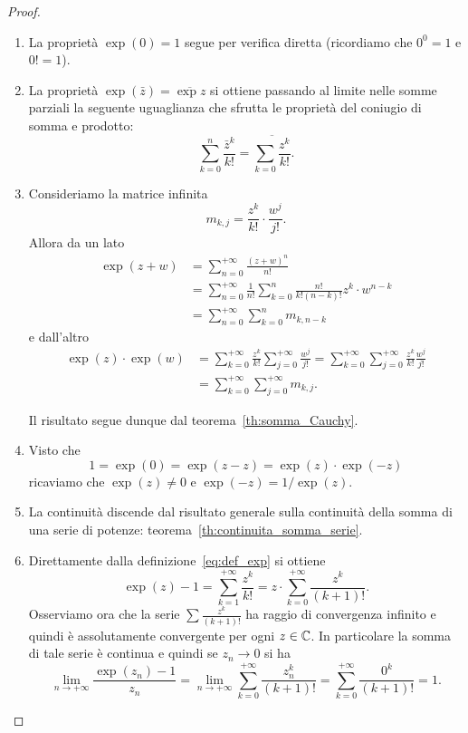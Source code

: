 \begin{proof}
\mymark{*}
\begin{enumerate}
\item
La proprietà $\exp(0)=1$ segue per verifica diretta (ricordiamo che $0^0=1$
e $0!=1$).

\item La proprietà $\exp(\bar z) = \overline{\exp z}$ si ottiene
passando al limite nelle somme parziali la seguente uguaglianza
che sfrutta le proprietà del coniugio di somma e prodotto:
\[
\sum_{k=0}^{n} \frac{\bar z^k}{k!} = \overline{\sum_{k=0} \frac{z^k}{k!}}.
\]


\item
Consideriamo la matrice infinita
\[
m_{k,j}  = \frac{z^k}{k!} \cdot \frac{w^j}{j!}.
\]
Allora da un lato
\begin{align*}
 \exp(z+w)
 &= \sum_{n=0}^{+\infty} \frac{(z+w)^n}{n!}\\
 &= \sum_{n=0}^{+\infty} \frac{1}{n!}\sum_{k=0}^n \frac{n!}{k!(n-k)!} z^k\cdot w^{n-k}\\
 &= \sum_{n=0}^{+\infty} \sum_{k=0}^n m_{k, n-k}
\end{align*}
e dall'altro
\begin{align*}
 \exp(z) \cdot \exp(w)
 &= \sum_{k=0}^{+\infty}\frac{z^k}{k!} \sum_{j=0}^{+\infty}\frac{w^j}{j!}
 = \sum_{k=0}^{+\infty}\sum_{j=0}^{+\infty}\frac{z^k}{k!} \frac{w^j}{j!} \\
 &= \sum_{k=0}^{+\infty}\sum_{j=0}^{+\infty} m_{k,j}.
\end{align*}

Il risultato segue dunque dal teorema~\ref{th:somma_Cauchy}.

\item
Visto che
\[
  1 = \exp( 0) = \exp(z-z) = \exp(z) \cdot \exp(-z)
\]
ricaviamo che $\exp(z)\neq 0$ e $\exp(-z) =  1 / \exp(z)$.

\item
La continuità discende dal risultato generale sulla continuità della
somma di una serie di potenze: teorema~\ref{th:continuita_somma_serie}.

\item
Direttamente dalla definizione~\eqref{eq:def_exp}
si ottiene
\[
 \exp(z) - 1 = \sum_{k=1}^{+\infty} \frac{z^k}{k!}
 = z \cdot \sum_{k=0}^{+\infty} \frac{z^k}{(k+1)!}.
\]
Osserviamo ora che la serie $\sum \frac{z^k}{(k+1)!}$ ha raggio di
convergenza infinito e quindi è assolutamente convergente per ogni $z\in \mathbb C$.
In particolare la somma di tale serie è continua e
quindi se $z_n \to 0$ si ha
\[
\lim_{n\to+\infty }\frac{\exp(z_n) - 1}{z_n}
   =  \lim_{n\to+\infty} \sum_{k=0}^{+\infty} \frac{z_n^k}{(k+1)!}
   = \sum_{k=0}^{+\infty}\frac{0^k}{(k+1)!} = 1.
\]
\end{enumerate}
\end{proof}

